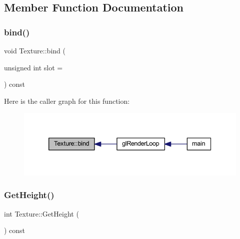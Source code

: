 \subsection{Member Function Documentation}
\mbox{\label{class_texture_a71ec7e2582cc0005fa47f78087d4a539}} 
\subsubsection{\texorpdfstring{bind()}{bind()}}
{\footnotesize\ttfamily void Texture\+::bind (\begin{DoxyParamCaption}\item[{unsigned int}]{slot = {} }\end{DoxyParamCaption}) const}

Here is the caller graph for this function\+:
\nopagebreak
\begin{figure}[H]
\begin{center}
\leavevmode
\includegraphics[width=339pt]{class_texture_a71ec7e2582cc0005fa47f78087d4a539_icgraph}
\end{center}
\end{figure}
\mbox{\label{class_texture_a289701837e23c9272509f377524ee8f2}} 
\subsubsection{\texorpdfstring{Get\+Height()}{GetHeight()}}
{\footnotesize\ttfamily int Texture\+::\+Get\+Height (\begin{DoxyParamCaption}{ }\end{DoxyParamCaption}) const\hspace{0.3cm}{\ttfamily [inline]}}

\mbox{\label{class_texture_a7f5ee18c7466f904fa371bd97399a944}} 
